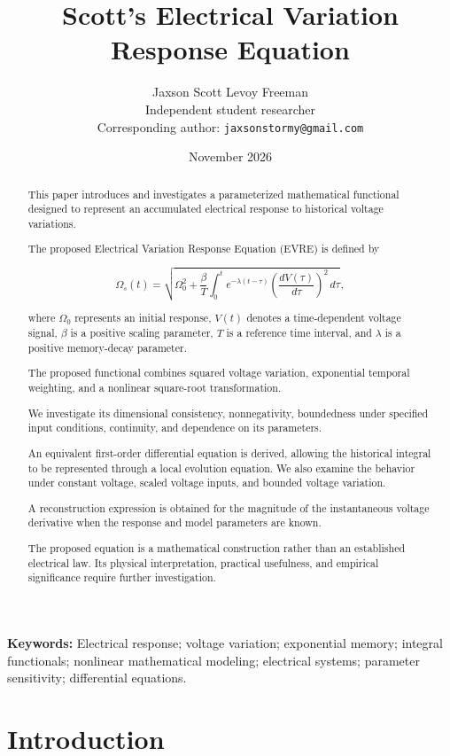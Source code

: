 \documentclass[12pt]{article}
\title{\textbf{Scott's Electrical Variation Response Equation}}
\author{
Jaxson Scott Levoy Freeman\\
\small Independent student researcher\\
\small Corresponding author: \texttt{jaxsonstormy@gmail.com}
}
\date{November 2026}
\theoremstyle{definition}
\theoremstyle{remark}
\begin{document}
\maketitle

\begin{abstract}

This paper introduces and investigates a parameterized
mathematical functional designed to represent an
accumulated electrical response to historical voltage
variations.

The proposed Electrical Variation Response Equation
(EVRE) is defined by

\[
\Omega_s(t)=
\sqrt{
\Omega_0^2+
\frac{\beta}{T}
\int_0^t
e^{-\lambda(t-\tau)}
\left(\frac{dV(\tau)}{d\tau}\right)^2
\,d\tau
},
\]

where \(\Omega_0\) represents an initial response,
\(V(t)\) denotes a time-dependent voltage signal,
\(\beta\) is a positive scaling parameter,
\(T\) is a reference time interval, and
\(\lambda\) is a positive memory-decay parameter.

The proposed functional combines squared voltage
variation, exponential temporal weighting, and
a nonlinear square-root transformation.

We investigate its dimensional consistency,
nonnegativity, boundedness under specified input
conditions, continuity, and dependence on its
parameters.

An equivalent first-order differential equation
is derived, allowing the historical integral to
be represented through a local evolution equation.
We also examine the behavior under constant voltage,
scaled voltage inputs, and bounded voltage variation.

A reconstruction expression is obtained for the
magnitude of the instantaneous voltage derivative
when the response and model parameters are known.

The proposed equation is a mathematical construction
rather than an established electrical law. Its
physical interpretation, practical usefulness, and
empirical significance require further investigation.

\end{abstract}

\noindent\textbf{Keywords:}
Electrical response; voltage variation;
exponential memory; integral functionals;
nonlinear mathematical modeling; electrical systems;
parameter sensitivity; differential equations.

\section{Introduction}
\end{document}

